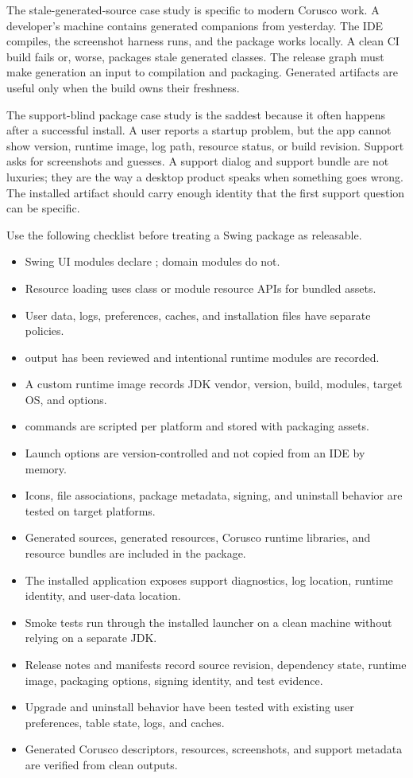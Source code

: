 The stale-generated-source case study is specific to modern Corusco work. A developer's machine contains generated companions from yesterday. The IDE compiles, the screenshot harness runs, and the package works locally. A clean CI build fails or, worse, packages stale generated classes. The release graph must make generation an input to compilation and packaging. Generated artifacts are useful only when the build owns their freshness.

The support-blind package case study is the saddest because it often happens after a successful install. A user reports a startup problem, but the app cannot show version, runtime image, log path, resource status, or build revision. Support asks for screenshots and guesses. A support dialog and support bundle are not luxuries; they are the way a desktop product speaks when something goes wrong. The installed artifact should carry enough identity that the first support question can be specific.

Use the following checklist before treating a Swing package as releasable.

\begin{itemize}
\item Swing UI modules declare ; domain modules do not.
\item Resource loading uses class or module resource APIs for bundled assets.
\item User data, logs, preferences, caches, and installation files have separate policies.
\item {} output has been reviewed and intentional runtime modules are recorded.
\item A custom runtime image records JDK vendor, version, build, modules, target OS, and  options.
\item {} commands are scripted per platform and stored with packaging assets.
\item Launch options are version-controlled and not copied from an IDE by memory.
\item Icons, file associations, package metadata, signing, and uninstall behavior are tested on target platforms.
\item Generated sources, generated resources, Corusco runtime libraries, and resource bundles are included in the package.
\item The installed application exposes support diagnostics, log location, runtime identity, and user-data location.
\item Smoke tests run through the installed launcher on a clean machine without relying on a separate JDK.
\item Release notes and manifests record source revision, dependency state, runtime image, packaging options, signing identity, and test evidence.
\item Upgrade and uninstall behavior have been tested with existing user preferences, table state, logs, and caches.
\item Generated Corusco descriptors, resources, screenshots, and support metadata are verified from clean outputs.
\end{itemize}

